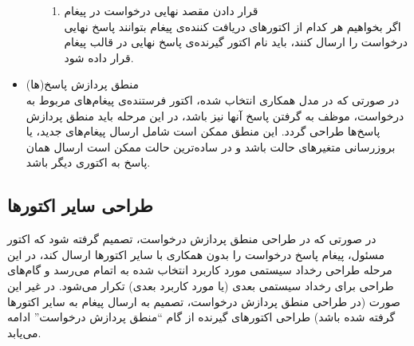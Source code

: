 \begin{itemize}
\begin{itemize}
\begin{enumerate}
\item قرار دادن مقصد نهایی درخواست در پیغام\\
اگر بخواهیم هر کدام از اکتورهای دریافت کننده‌ی پیغام بتوانند پاسخ نهایی درخواست را ارسال کنند، باید نام اکتور گیرنده‌ی پاسخ نهایی در قالب پیغام قرار داده شود.
\end{enumerate}
\end{itemize}
\item منطق پردازش پاسخ(ها)\\
در صورتی که در مدل همکاری انتخاب شده، اکتور فرستنده‌ی پیغام‌های مربوط به درخواست، موظف به گرفتن پاسخ آنها نیز باشد، در این مرحله باید منطق پردازش پاسخ‌ها طراحی گردد. این منطق ممکن است شامل ارسال پیغام‌های جدید، یا بروزرسانی متغیرهای حالت باشد و در ساده‌ترین حالت ممکن است ارسال همان پاسخ به اکتوری دیگر باشد.
\end{itemize}

\subsection{طراحی سایر اکتورها}
در صورتی که در طراحی منطق پردازش درخواست، تصمیم گرفته شود که اکتور مسئول، پیغام پاسخ درخواست را بدون همکاری با سایر اکتورها ارسال کند، در این مرحله طراحی رخداد سیستمی مورد کاربرد انتخاب شده به اتمام می‌رسد و گام‌های طراحی برای رخداد سیستمی بعدی (یا مورد کاربرد بعدی) تکرار می‌شود. در غیر این صورت 
(در طراحی منطق پردازش درخواست، تصمیم به ارسال پیغام به سایر اکتورها گرفته شده باشد) طراحی اکتورهای گیرنده از گام ``منطق پردازش درخواست'' ادامه می‌یابد.

